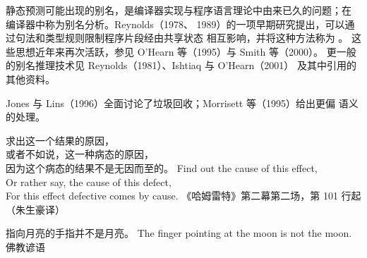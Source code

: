 静态预测可能出现的别名，是编译器实现与程序语言理论中由来已久的问题；在
编译器中称为别名分析。Reynolds（1978、
1989）的一项早期研究提出，可以通过句法和类型规则限制程序片段经由共享状态
相互影响，并将这种方法称为
。
这些思想近年来再次活跃，参见 O'Hearn 等（1995）与 Smith 等（2000）。
更一般的别名推理技术见 Reynolds（1981）、Ishtiaq 与 O'Hearn（2001）
及其中引用的其他资料。

Jones 与 Lins（1996）全面讨论了垃圾回收；Morrisett 等（1995）给出更偏
语义的处理。

\bilingualepigraph
  {求出这一个结果的原因，\\
   或者不如说，这一种病态的原因，\\
   因为这个病态的结果不是无因而至的。}
  {Find out the cause of this effect,\\
   Or rather say, the cause of this defect,\\
   For this effect defective comes by cause.}
  {《哈姆雷特》第二幕第二场，第 101 行起（朱生豪译）}

\bilingualepigraph
  {指向月亮的手指并不是月亮。}
  {The finger pointing at the moon is not the moon.}
  {佛教谚语}
